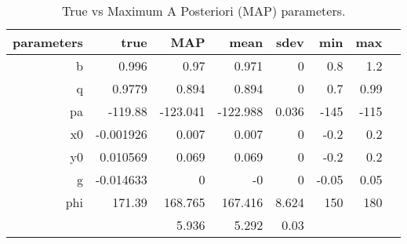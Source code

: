 \begin{table*}[!htb]\caption{True vs Maximum A Posteriori (MAP) parameters.}\begin{center}\begin{tabular}{ r r r r r r r r } parameters & true & MAP & mean & sdev & min & max \\ 
\hline b & 0.996 & 0.97 & 0.971 & 0 & 0.8 & 1.2 \\ 
 q & 0.9779 & 0.894 & 0.894 & 0 & 0.7 & 0.99 \\ 
 pa & -119.88 & -123.041 & -122.988 & 0.036 & -145 & -115 \\ 
 x0 & -0.001926 & 0.007 & 0.007 & 0 & -0.2 & 0.2 \\ 
 y0 & 0.010569 & 0.069 & 0.069 & 0 & -0.2 & 0.2 \\ 
 g & -0.014633 & 0 & -0 & 0 & -0.05 & 0.05 \\ 
 phi & 171.39 & 168.765 & 167.416 & 8.624 & 150 & 180 \\ 
  &  & 5.936 & 5.292 & 0.03 &  &  \\ 
\hline\end{tabular}\end{center}\label{tab:1}\end{table*}